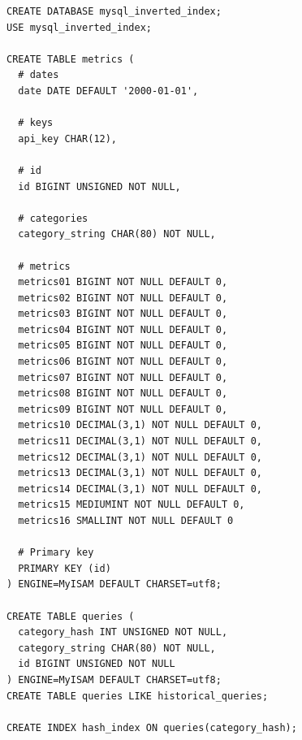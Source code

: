 \begin{verbatim}
CREATE DATABASE mysql_inverted_index;
USE mysql_inverted_index;

CREATE TABLE metrics ( 
  # dates
  date DATE DEFAULT '2000-01-01',

  # keys
  api_key CHAR(12),

  # id
  id BIGINT UNSIGNED NOT NULL,

  # categories
  category_string CHAR(80) NOT NULL,

  # metrics
  metrics01 BIGINT NOT NULL DEFAULT 0,
  metrics02 BIGINT NOT NULL DEFAULT 0,
  metrics03 BIGINT NOT NULL DEFAULT 0,
  metrics04 BIGINT NOT NULL DEFAULT 0,
  metrics05 BIGINT NOT NULL DEFAULT 0,
  metrics06 BIGINT NOT NULL DEFAULT 0,
  metrics07 BIGINT NOT NULL DEFAULT 0,
  metrics08 BIGINT NOT NULL DEFAULT 0,
  metrics09 BIGINT NOT NULL DEFAULT 0,
  metrics10 DECIMAL(3,1) NOT NULL DEFAULT 0,
  metrics11 DECIMAL(3,1) NOT NULL DEFAULT 0,
  metrics12 DECIMAL(3,1) NOT NULL DEFAULT 0,
  metrics13 DECIMAL(3,1) NOT NULL DEFAULT 0,
  metrics14 DECIMAL(3,1) NOT NULL DEFAULT 0,
  metrics15 MEDIUMINT NOT NULL DEFAULT 0,
  metrics16 SMALLINT NOT NULL DEFAULT 0
  
  # Primary key
  PRIMARY KEY (id)
) ENGINE=MyISAM DEFAULT CHARSET=utf8;

CREATE TABLE queries (
  category_hash INT UNSIGNED NOT NULL,
  category_string CHAR(80) NOT NULL,
  id BIGINT UNSIGNED NOT NULL
) ENGINE=MyISAM DEFAULT CHARSET=utf8;
CREATE TABLE queries LIKE historical_queries;

CREATE INDEX hash_index ON queries(category_hash);
\end{verbatim}



